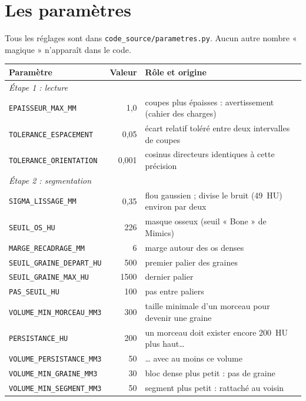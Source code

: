 \documentclass[11pt,a4paper]{article}
\newcommand{\fichier}[1]{\texttt{\small #1}}
\begin{document}
\clearpage
\appendix
\section{Les paramètres}
\label{ann-parametres}

Tous les réglages sont dans \fichier{code\_source/parametres.py}. Aucun autre nombre « magique » n'apparaît dans le
code.

\begin{longtable}{p{5.6cm}rp{7.4cm}}
\toprule
\textbf{Paramètre} & \textbf{Valeur} & \textbf{Rôle et origine} \\
\midrule
\endhead
\multicolumn{3}{l}{\textit{Étape 1 : lecture}} \\
\texttt{EPAISSEUR\_MAX\_MM} & 1,0 & coupes plus épaisses : avertissement (cahier des charges) \\
\texttt{TOLERANCE\_ESPACEMENT} & 0,05 & écart relatif toléré entre deux intervalles de coupes \\
\texttt{TOLERANCE\_ORIENTATION} & 0,001 & cosinus directeurs identiques à cette précision \\
\multicolumn{3}{l}{\textit{Étape 2 : segmentation}} \\
\texttt{SIGMA\_LISSAGE\_MM} & 0,35 & flou gaussien ; divise le bruit (49~HU) environ par deux \\
\texttt{SEUIL\_OS\_HU} & 226 & masque osseux (seuil « Bone » de Mimics) \\
\texttt{MARGE\_RECADRAGE\_MM} & 6 & marge autour des os denses \\
\texttt{SEUIL\_GRAINE\_DEPART\_HU} & 500 & premier palier des graines \\
\texttt{SEUIL\_GRAINE\_MAX\_HU} & 1500 & dernier palier \\
\texttt{PAS\_SEUIL\_HU} & 100 & pas entre paliers \\
\texttt{VOLUME\_MIN\_MORCEAU\_MM3} & 300 & taille minimale d'un morceau pour devenir une graine \\
\texttt{PERSISTANCE\_HU} & 200 & un morceau doit exister encore 200~HU plus haut\ldots \\
\texttt{VOLUME\_PERSISTANCE\_MM3} & 50 & \ldots{} avec au moins ce volume \\
\texttt{VOLUME\_MIN\_GRAINE\_MM3} & 30 & bloc dense plus petit : pas de graine \\
\texttt{VOLUME\_MIN\_SEGMENT\_MM3} & 50 & segment plus petit : rattaché au voisin \\

\end{longtable}
\end{document}
